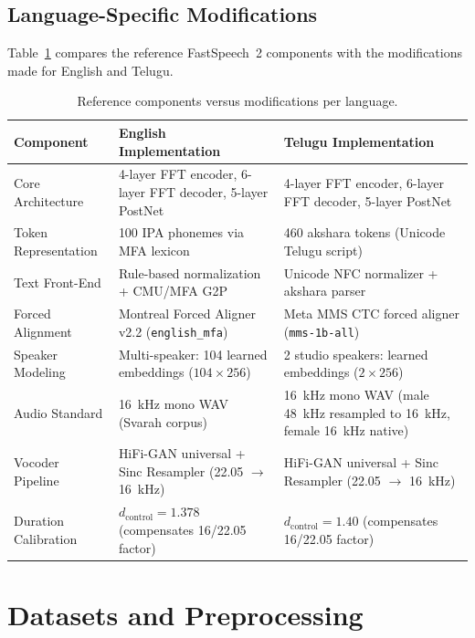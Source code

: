 \documentclass[11pt,a4paper]{report}
\begin{document}
\section{Language-Specific Modifications}
Table~\ref{tab:changes} compares the reference FastSpeech~2 components with the modifications made for English and Telugu.

\begin{table}[!htbp]
\centering
\caption{Reference components versus modifications per language.}
\label{tab:changes}
\small
\begin{tabularx}{\textwidth}{>{\raggedright\arraybackslash}p{3.2cm}XX}
\toprule
\textbf{Component} & \textbf{English Implementation} & \textbf{Telugu Implementation} \\
\midrule
Core Architecture & 4-layer FFT encoder, 6-layer FFT decoder, 5-layer PostNet & 4-layer FFT encoder, 6-layer FFT decoder, 5-layer PostNet \\
Token Representation & 100 IPA phonemes via MFA lexicon & 460 akshara tokens (Unicode Telugu script) \\
Text Front-End & Rule-based normalization + CMU/MFA G2P & Unicode NFC normalizer + akshara parser \\
Forced Alignment & Montreal Forced Aligner v2.2 (\texttt{english\_mfa}) & Meta MMS CTC forced aligner (\texttt{mms-1b-all}) \\
Speaker Modeling & Multi-speaker: 104 learned embeddings ($104 \times 256$) & 2 studio speakers: learned embeddings ($2 \times 256$) \\
Audio Standard & 16~kHz mono WAV (Svarah corpus) & 16~kHz mono WAV (male 48~kHz resampled to 16~kHz, female 16~kHz native) \\
Vocoder Pipeline & HiFi-GAN universal + Sinc Resampler (22.05 $\to$ 16~kHz) & HiFi-GAN universal + Sinc Resampler (22.05 $\to$ 16~kHz) \\
Duration Calibration & $d_{\text{control}} = 1.378$ (compensates 16/22.05 factor) & $d_{\text{control}} = 1.40$ (compensates 16/22.05 factor) \\
\bottomrule
\end{tabularx}
\end{table}

\FloatBarrier
\vspace{1.5em}

\chapter{Datasets and Preprocessing}
\end{document}
